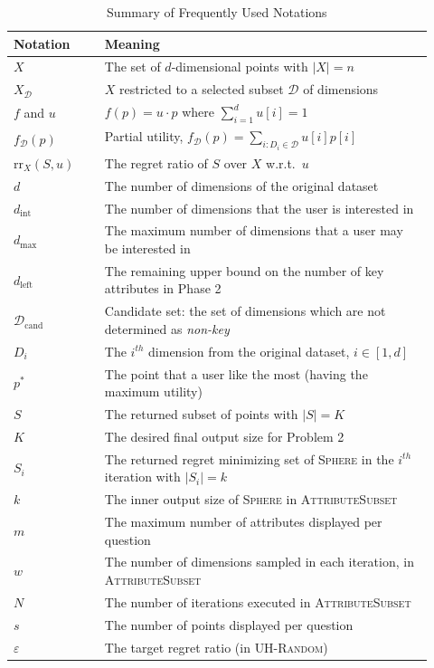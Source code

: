 \documentclass[conference]{IEEEtran}
\theoremstyle{definition}
\theoremstyle{plain}
\begin{document}
\begin{table}[h]
\centering
\small
\renewcommand{\arraystretch}{1.15}
\setlength{\tabcolsep}{4pt}

\renewcommand{\arraystretch}{1.2}
\begin{tabular}{|>{\centering\arraybackslash}m{0.20\linewidth}|>{\centering\arraybackslash}m{0.72\linewidth}|}
\hline
\textbf{Notation} & \textbf{Meaning} \\
\hline\hline
$X$ & The set of $d$-dimensional points with $|X| = n$ \\
\hline
$X_\mathcal{D}$ & $X$ restricted to a selected subset $\mathcal{D}$ of dimensions\\
\hline
$f$ and $u$ & $f(p)=u\cdot p$ where $\sum_{i=1}^{d} u[i]=1$ \\
\hline
$f_\mathcal{D} (p)$ & Partial utility, $f_\mathcal{D} (p) = \sum_{i:D_i\in \mathcal{D}}u[i]p[i]$ \\
\hline
$\mathrm{rr}_X(S,u)$ & The regret ratio of $S$ over $X$ w.r.t.\ $u$ \\
\hline
$d$ & The number of dimensions of the original dataset \\
\hline
$d_\text{int}$ & The number of dimensions that the user is interested in \\
\hline
$d_\text{max}$ & The maximum number of dimensions that a user may be interested in \\
\hline
$d_\text{left}$ & The remaining upper bound on the number of key attributes in Phase 2 \\
\hline
$\mathcal{D}_\text{cand}$ & Candidate set: the set of dimensions which are not determined as \textit{non-key} \\
\hline
$D_i$ & The $i^{th}$ dimension from the original dataset, $i\in[1,d]$\\
\hline
$p^*$ & The point that a user like the most (having the maximum utility) \\
\hline
$S$ & The returned subset of points with $|S|=K$ \\
\hline
$K$ & The desired final output size for Problem 2 \\
\hline
$S_i$ & The returned regret minimizing set of \textsc{Sphere} in the $i^{th}$ iteration with $|S_i|=k$ \\
\hline
$k$ & The inner output size of \textsc{Sphere} in \textsc{AttributeSubset} \\
\hline
$m$ & The maximum number of attributes displayed per question \\
\hline
$w$ & The number of dimensions sampled in each iteration, in \textsc{AttributeSubset} \\
\hline
$N$ & The number of iterations executed in \textsc{AttributeSubset} \\
\hline
$s$ & The number of points displayed per question \\
\hline
$\varepsilon$ & The target regret ratio (in \textsc{UH-Random})\\
\hline
\end{tabular}
\caption{Summary of Frequently Used Notations}
\label{tab:notations}
\end{table}
\end{document}
